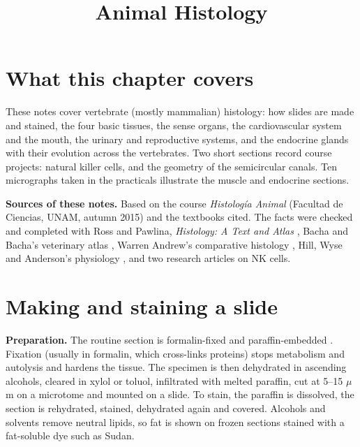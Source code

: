 



\title{Animal Histology}
\maketitle

\label{section-phantom}

\tableofcontents

\section{What this chapter covers}
\label{section-overview}

These notes cover vertebrate (mostly
mammalian) histology: how slides are made and
stained, the four basic tissues, the sense
organs, the cardiovascular system and the
mouth, the urinary and reproductive systems,
and the endocrine glands with their evolution
across the vertebrates. Two short sections
record course projects:
natural killer cells, and the geometry of the
semicircular canals. Ten micrographs taken
in the practicals illustrate the muscle and
endocrine sections.

\textbf{Sources of these notes.} Based on
the course \emph{Histolog\'ia Animal}
(Facultad de Ciencias, UNAM,
autumn 2015) and the textbooks cited.
The facts were checked
and completed with Ross and Pawlina,
\emph{Histology: A Text and Atlas}
\cite{ross2011histology}, Bacha and Bacha's
veterinary atlas \cite{bacha2000veterinary},
Warren Andrew's comparative histology
\cite{andrew1959comparative}, Hill, Wyse and
Anderson's physiology \cite{hill2012animal},
and two research articles on NK cells.

\section{Making and staining a slide}
\label{section-technique}

\textbf{Preparation.} The routine section is
formalin-fixed and paraffin-embedded
\cite[Chapter 1]{ross2011histology}. Fixation
(usually in formalin, which cross-links
proteins) stops metabolism and autolysis and
hardens the tissue. The specimen is then
dehydrated in ascending alcohols, cleared in
xylol or toluol, infiltrated with melted
paraffin, cut at 5--15 $\mu$m on a microtome
and mounted on a slide. To stain, the
paraffin is dissolved, the section is
rehydrated, stained, dehydrated again and
covered. Alcohols and solvents remove neutral
lipids, so fat is shown on frozen sections
stained with a fat-soluble dye such as Sudan.

